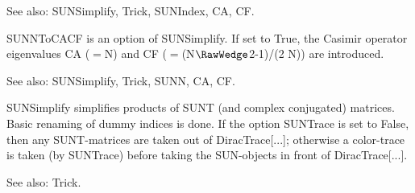 See also:  SUNSimplify, Trick, SUNIndex, CA, CF.






SUNNToCACF is an option of SUNSimplify. If set to True, the Casimir operator eigenvalues CA (\(=\)N) and CF (\(=\)(N\(\RawWedge\)2-1)/(2
  N)) are introduced.

See also:  SUNSimplify, Trick, SUNN, CA, CF.






SUNSimplify simplifies products of SUNT (and complex conjugated) matrices. Basic renaming of dummy indices is done. If the option
  SUNTrace is set to False, then any SUNT-matrices are taken out of DiracTrace[...]; otherwise a color-trace is taken (by SUNTrace)
  before taking the SUN-objects in front of DiracTrace[...].



See also:  Trick.








